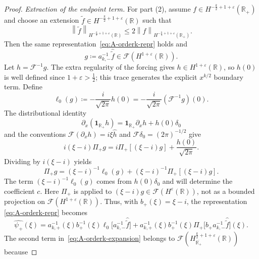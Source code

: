 \documentclass[11pt,reqno]{amsart}
\theoremstyle{plain}
\theoremstyle{definition}
\numberwithin{equation}{section}
\newcommand{\paren}[1]{\left(#1\right)}
\newcommand{\p}{\partial}
\newcommand{\wh}[1]{\widehat{#1}}
\newcommand{\wt}[1]{\widetilde{#1}}
\newcommand{\norm}[1]{\left\lVert #1 \right\rVert}
\newcommand{\R}{\mathbb{R}}
\begin{document}
\begin{proof}
\emph{Extraction of the endpoint term.}
For part (2), assume
$f\in H^{-\frac{k}{2}+1+\varepsilon}(\R_+)$ and choose an extension
$\wt f\in H^{-\frac{k}{2}+1+\varepsilon}(\R)$ such that
\begin{equation}
    \norm{\wt f}_{H^{-\frac{k}{2}+1+\varepsilon}(\R)}
    \le 2\norm{f}_{H^{-\frac{k}{2}+1+\varepsilon}(\R_+)}.
\end{equation}
Then the same representation~\eqref{eq:A-orderk-repr} holds and
\begin{equation}
    g\coloneqq a_{k,-}^{-1}\wh{\wt f}
    \in\mathcal F(H^{1+\varepsilon}(\R)).
\end{equation}
Let $h=\mathcal F^{-1}g$. The extra regularity of the forcing gives
$h\in H^{1+\varepsilon}(\R)$, so $h(0)$ is well defined since
$1+\varepsilon>\frac12$; this trace generates the explicit $x^{k/2}$
boundary term. Define
\begin{equation}\label{eq:Pi-prime-definition}
    \ell_0(g)
    \coloneqq
    -\frac{i}{\sqrt{2\pi}}h(0)
    =
    -\frac{i}{\sqrt{2\pi}}
    \left(\mathcal F^{-1}g\right)(0).
\end{equation}
The distributional identity
\begin{equation}
    \p_x\paren{\mathbf1_{\R_+}h}
    =\mathbf1_{\R_+}\p_xh+h(0)\delta_0
\end{equation}
and the conventions $\mathcal F(\p_xh)=i\xi\wh h$ and
$\mathcal F\delta_0=(2\pi)^{-1/2}$ give
\begin{equation*}
    i(\xi-i)\Pi_+g
    =i\Pi_+\!\left[(\xi-i)g\right]+\frac{h(0)}{\sqrt{2\pi}}.
\end{equation*}
Dividing by $i(\xi-i)$ yields
\begin{equation}\label{eq:Pi-first-order-expansion}
    \Pi_+g
    =(\xi-i)^{-1}\ell_0(g)
    +(\xi-i)^{-1}\Pi_+\!\left[(\xi-i)g\right].
\end{equation}
The term $(\xi-i)^{-1}\ell_0(g)$ comes from $h(0)\delta_0$ and will
determine the coefficient $c$.
Here $\Pi_+$ is applied to $(\xi-i)g\in\mathcal F(H^\varepsilon(\R))$,
not as a bounded projection on $\mathcal F(H^{1+\varepsilon}(\R))$.
Thus, with $b_+(\xi)=\xi-i$, the representation
\eqref{eq:A-orderk-repr} becomes
\begin{equation}\label{eq:A-orderk-expansion}
    \wh{\psi_+}(\xi)
    = a_{k,+}^{-1}(\xi)b_+^{-1}(\xi)
      \ell_0\!\bigl[a_{k,-}^{-1}\wh{\wt f}\bigr]
    + a_{k,+}^{-1}(\xi)b_+^{-1}(\xi)
      \Pi_+\!\bigl[b_+a_{k,-}^{-1}\wh{\wt f}\bigr](\xi).
\end{equation}
The second term in~\eqref{eq:A-orderk-expansion} belongs to $\mathcal{F}(H^{\frac{k}{2}+1+\varepsilon}_{\overline{\R_+}}(\R))$ because

\end{proof}
\end{document}
